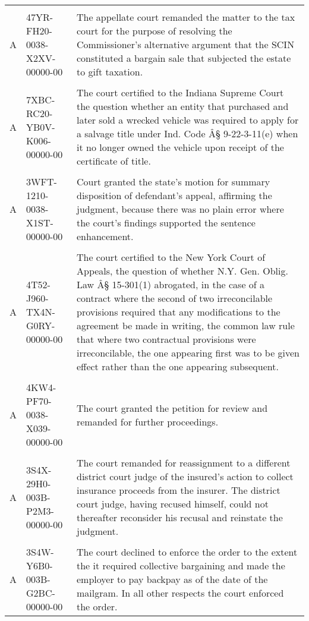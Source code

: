 \documentclass[10pt, letterpaper]{article}
\begin{document}
\begin{spacing}{1.0}
\begin{small}
\begin{longtable}[H]{llp{4in}}
    & &\\[-4pt]
    A & 47YR-FH20-0038-X2XV-00000-00 & The appellate court remanded the matter to the tax court for the purpose of resolving the Commissioner's alternative argument that the SCIN constituted a bargain sale that subjected the estate to gift taxation.\\
    & &\\[-4pt]
    A & 7XBC-RC20-YB0V-K006-00000-00 & The court certified to the Indiana Supreme Court the question whether an entity that purchased and later sold a wrecked vehicle was required to apply for a salvage title under Ind. Code Â§ 9-22-3-11(e) when it no longer owned the vehicle upon receipt of the certificate of title.\\
    & &\\[-4pt]
    A & 3WFT-1210-0038-X1ST-00000-00 & Court granted the state's motion for summary disposition of defendant's appeal, affirming the judgment, because there was no plain error where the court's findings supported the sentence enhancement.\\
    & &\\[-4pt]
    A & 4T52-J960-TX4N-G0RY-00000-00 & The court certified to the New York Court of Appeals, the question of whether N.Y. Gen. Oblig. Law Â§ 15-301(1) abrogated, in the case of a contract where the second of two irreconcilable provisions required that any modifications to the agreement be made in writing, the common law rule that where two contractual provisions were irreconcilable, the one appearing first was to be given effect rather than the one appearing subsequent.\\
    & &\\[-4pt]
    A & 4KW4-PF70-0038-X039-00000-00 & The court granted the petition for review and remanded for further proceedings.\\
    & &\\[-4pt]
    A & 3S4X-29H0-003B-P2M3-00000-00 & The court remanded for reassignment to a different district court judge of the insured's action to collect insurance proceeds from the insurer. The district court judge, having recused himself, could not thereafter reconsider his recusal and reinstate the judgment.\\
    & &\\[-4pt]
    A & 3S4W-Y6B0-003B-G2BC-00000-00 & The court declined to enforce the order to the extent the it required collective bargaining and made the employer to pay backpay as of the date of the mailgram. In all other respects the court enforced the order.\\

\end{longtable}
\end{small}
\end{spacing}
\end{document}

